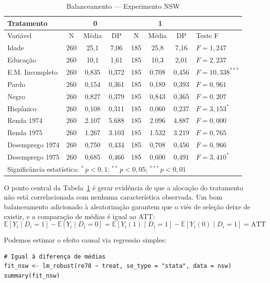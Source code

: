 \documentclass[12pt,a4paper]{article}
\begin{document}
\begin{table}[H]
\centering
\caption{Balanceamento --- Experimento NSW}\label{tab:balance}
\begin{tabular}{lccccccl}
\toprule
Tratamento & \multicolumn{3}{c}{0} & \multicolumn{3}{c}{1} & \\
\midrule
Variável & N & Média & DP & N & Média & DP & Teste F \\
\midrule
Idade              & 260 & 25,1  & 7,06 & 185 & 25,8  & 7,16 & $F=1{,}247$      \\
Educação           & 260 & 10,1  & 1,61 & 185 & 10,3  & 2,01 & $F=2{,}237$      \\
E.M. Incompleto    & 260 & 0,835 & 0,372 & 185 & 0,708 & 0,456 & $F=10{,}338^{***}$ \\
Pardo              & 260 & 0,154 & 0,361 & 185 & 0,189 & 0,393 & $F=0{,}961$      \\
Negro              & 260 & 0,827 & 0,379 & 185 & 0,843 & 0,365 & $F=0{,}207$      \\
Hispânico          & 260 & 0,108 & 0,311 & 185 & 0,060 & 0,237 & $F=3{,}153^{*}$  \\
Renda 1974         & 260 & 2.107 & 5.688 & 185 & 2.096 & 4.887 & $F=0{,}000$      \\
Renda 1975         & 260 & 1.267 & 3.103 & 185 & 1.532 & 3.219 & $F=0{,}765$      \\
Desemprego 1974    & 260 & 0,750 & 0,434 & 185 & 0,708 & 0,456 & $F=0{,}966$      \\
Desemprego 1975    & 260 & 0,685 & 0,466 & 185 & 0,600 & 0,491 & $F=3{,}410^{*}$  \\
\midrule
\multicolumn{8}{l}{\footnotesize Significância estatística: $^{*}\,p<0{,}1$;\; $^{**}\,p<0{,}05$;\; $^{***}\,p<0{,}01$}\\
\end{tabular}
\end{table}

O ponto central da Tabela~\ref{tab:balance} é gerar evidência de que a alocação do tratamento não está correlacionada com nenhuma característica observada. Um bom balanceamento adicionado à aleatorização garantem que o viés de seleção deixe de existir, e a comparação de médias é igual ao ATT:
$$\mathbb{E}[Y_i \mid D_i = 1] - \mathbb{E}[Y_i \mid D_i = 0] = \mathbb{E}[Y_i(1) \mid D_i = 1] - \mathbb{E}[Y_i(0) \mid D_i = 1] = \text{ATT}$$

Podemos estimar o efeito causal via regressão simples:

\begin{lstlisting}[style=Rstyle]
# Igual à diferença de médias
fit_nsw <- lm_robust(re78 ~ treat, se_type = "stata", data = nsw)
summary(fit_nsw)
\end{lstlisting}
\end{document}
